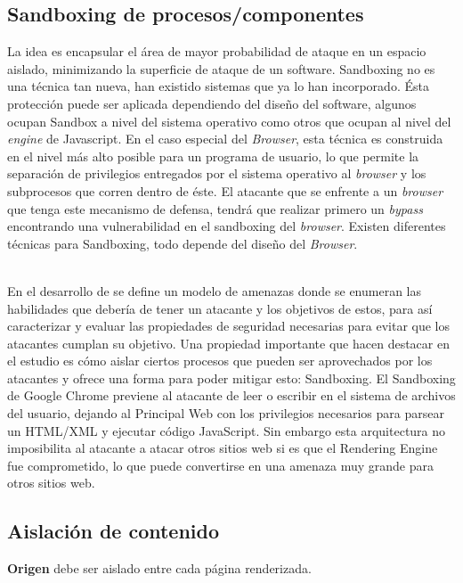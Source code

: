 \subsection{Sandboxing de procesos/componentes}
    \label{chap3:Sandboxing}
    La idea es encapsular el área de mayor probabilidad de ataque en un espacio aislado, minimizando la superficie de ataque de un software. Sandboxing no es una técnica tan nueva, han existido sistemas que ya lo han incorporado. Ésta protección puede ser aplicada dependiendo del diseño del software, algunos ocupan Sandbox a nivel del sistema operativo como otros que ocupan al nivel del \textit{engine} de Javascript. En el caso especial del \textit{Browser}, esta técnica es construida en el nivel más alto posible para un programa de usuario, lo que permite la separación de privilegios entregados por el sistema operativo al \textit{browser} y los subprocesos que corren dentro de éste. El atacante que se enfrente a un \textit{browser} que tenga este mecanismo de defensa, tendrá que realizar primero un \textit{bypass} encontrando una vulnerabilidad en el sandboxing del \textit{browser}. Existen diferentes técnicas para Sandboxing, todo depende del diseño del \textit{Browser}.

    \\En el desarrollo de \cite{barth2008security} se define un modelo de amenazas donde se enumeran las habilidades que debería de tener un atacante y los objetivos de estos, para así caracterizar y evaluar las propiedades de seguridad necesarias para evitar que los atacantes cumplan su objetivo. Una propiedad importante que hacen destacar en el estudio es cómo aislar ciertos procesos que pueden ser aprovechados por los atacantes y ofrece una forma para poder mitigar esto: Sandboxing. El Sandboxing de Google Chrome previene al atacante de leer o escribir en el sistema de archivos del usuario, dejando al Principal Web con los privilegios necesarios para parsear un HTML/XML y ejecutar código JavaScript. Sin embargo esta arquitectura no imposibilita al atacante a atacar otros sitios web si es que el Rendering Engine fue comprometido, lo que puede convertirse en una amenaza muy grande para otros sitios web.


 \subsection{Aislación de contenido}
 	\textbf{Origen} debe ser aislado entre cada página renderizada.

